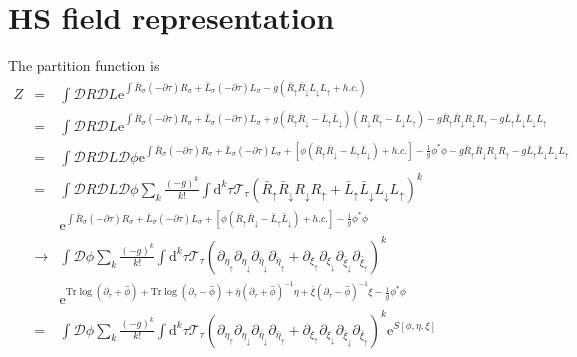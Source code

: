 \documentclass[10pt]{article}
\newcommand{\bea}{\begin{eqnarray}}
\newcommand{\eea}{\end{eqnarray}}
\newcommand{\md}{\mathrm{d}}
\newcommand{\me}{\mathrm{e}}
\begin{document}
\section{HS field representation}
The partition function is
\bea Z&=&\int{ \mathcal{D}R\mathcal{D}L \me^{\int{ \bar{R}_\sigma (-\partial\tau)R_\sigma + \bar{L}_\sigma (-\partial\tau)L_\sigma -g(\bar{R}_\uparrow \bar{R}_\downarrow L_\downarrow L_\uparrow + h.c.)} }} \\
&=&\int{ \mathcal{D}R\mathcal{D}L \me^{\int {\bar{R}_\sigma (-\partial\tau)R_\sigma + \bar{L}_\sigma (-\partial\tau)L_\sigma +g(\bar{R}_\uparrow \bar{R}_\downarrow-\bar{L}_\uparrow \bar{L}_\downarrow)(R_\downarrow R_\uparrow-L_\downarrow L_\uparrow) - g\bar{R}_\uparrow \bar{R}_\downarrow R_\downarrow R_\uparrow -g \bar{L}_\uparrow \bar{L}_\downarrow L_\downarrow L_\uparrow}}}  \\
&=&\int{ \mathcal{D}R\mathcal{D}L\mathcal{D}\phi \me^{ \int{  \bar{R}_\sigma (-\partial\tau)R_\sigma + \bar{L}_\sigma (-\partial\tau)L_\sigma +[\phi (\bar{R}_\uparrow \bar{R}_\downarrow-\bar{L}_\uparrow \bar{L}_\downarrow) + h.c.]-\frac1g\phi^*\phi  - g\bar{R}_\uparrow \bar{R}_\downarrow R_\downarrow R_\uparrow -g \bar{L}_\uparrow \bar{L}_\downarrow L_\downarrow L_\uparrow }}} \\
&=&\int \mathcal{D}R\mathcal{D}L\mathcal{D}\phi \sum_k \frac{(-g)^k}{k!} \int \md^k\tau \mathcal{T}_\tau (\bar{R}_\uparrow \bar{R}_\downarrow R_\downarrow R_\uparrow +\bar{L}_\uparrow \bar{L}_\downarrow L_\downarrow L_\uparrow)^k \nonumber\\ 
&&  \me^{ \int{  \bar{R}_\sigma (-\partial\tau)R_\sigma + \bar{L}_\sigma (-\partial\tau)L_\sigma +[\phi (\bar{R}_\uparrow \bar{R}_\downarrow-\bar{L}_\uparrow \bar{L}_\downarrow) + h.c.]-\frac1g\phi^*\phi  }} \\
&\rightarrow&\int \mathcal{D}\phi\sum_k\frac{(-g)^k}{k!}\int \md^k\tau\mathcal{T}_\tau(\partial_{\eta_\uparrow}\partial_{\eta_\downarrow}\partial_{\bar{\eta}_\downarrow}\partial_{\bar{\eta}_\uparrow}+\partial_{\xi_\uparrow}\partial_{\xi_\downarrow}\partial_{\bar{\xi}_\downarrow}\partial_{\bar{\xi}_\uparrow})^k \nonumber\\&& \me^{\mathrm{Tr}\log(\partial_\tau+\hat{\phi})+\mathrm{Tr}\log(\partial_\tau-\hat{\phi})+\bar{\eta}(\partial_\tau+\hat{\phi})^{-1}\eta+\bar{\xi}(\partial_\tau-\hat{\phi})^{-1}\xi-\frac1g\phi^*\phi} \\
&=& \int \mathcal{D}\phi \sum_k \frac{(-g)^k}{k!}\int \md^k\tau \mathcal{T}_\tau (\partial_{\eta_\uparrow}\partial_{\eta_\downarrow}\partial_{\bar{\eta}_\downarrow}\partial_{\bar{\eta}_\uparrow}+\partial_{\xi_\uparrow}\partial_{\xi_\downarrow}\partial_{\bar{\xi}_\downarrow}\partial_{\bar{\xi}_\uparrow})^k \me^{S[\phi,\eta,\xi]} \eea
\end{document}
